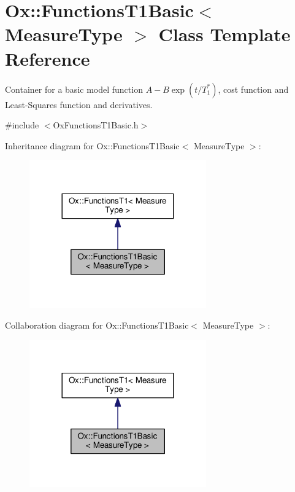 \hypertarget{class_ox_1_1_functions_t1_basic}{\section{Ox\-:\-:Functions\-T1\-Basic$<$ Measure\-Type $>$ Class Template Reference}
\label{class_ox_1_1_functions_t1_basic}
}


Container for a basic model function $ A-B\exp(t/T_1^*) $, cost function and Least-\/\-Squares function and derivatives.  




{\ttfamily \#include $<$Ox\-Functions\-T1\-Basic.\-h$>$}



Inheritance diagram for Ox\-:\-:Functions\-T1\-Basic$<$ Measure\-Type $>$\-:
\nopagebreak
\begin{figure}[H]
\begin{center}
\leavevmode
\includegraphics[width=216pt]{class_ox_1_1_functions_t1_basic__inherit__graph}
\end{center}
\end{figure}


Collaboration diagram for Ox\-:\-:Functions\-T1\-Basic$<$ Measure\-Type $>$\-:
\nopagebreak
\begin{figure}[H]
\begin{center}
\leavevmode
\includegraphics[width=216pt]{class_ox_1_1_functions_t1_basic__coll__graph}
\end{center}
\end{figure}
